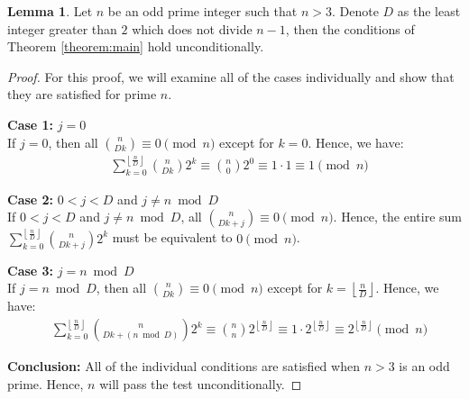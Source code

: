 \documentclass{article}
\theoremstyle{plain}
\theoremstyle{definition}
\newtheorem{lemma}{Lemma}
\newcommand{\floor}[1]{\left\lfloor #1 \right\rfloor}
\begin{document}
\begin{lemma} \label{lemma:primes}
Let $n$ be an odd prime integer such that $n > 3$. Denote $D$ as the least integer greater than $2$ which does not divide $n-1$, then the conditions of Theorem \ref{theorem:main} hold unconditionally.
\end{lemma}
\begin{proof}
For this proof, we will examine all of the cases individually and show that they are satisfied for prime $n$.

\textbf{Case 1:} $j=0$ \\
If $j = 0$, then all $\binom{n}{D k} \equiv 0 \pmod{n}$ except for $k=0$. Hence, we have:
\begin{align}
    & \sum_{k=0}^{\floor{\frac{n}{D}}} \binom{n}{D k} 2^{k} \equiv \binom{n}{0} 2^{0} \equiv 1 \cdot 1 \equiv 1 \pmod{n}
\end{align}

\textbf{Case 2:} $0 < j < D$ and $j \neq n \bmod{D}$ \\
If $0 < j < D$ and $j \neq n \bmod{D}$, all $\binom{n}{D k + j} \equiv 0 \pmod{n}$. Hence, the entire sum $\sum_{k=0}^{\floor{\frac{n}{D}}} \binom{n}{D k + j} 2^{k}$ must be equivalent to $0 \pmod{n}$.

\textbf{Case 3:} $j=n \bmod{D}$ \\
If $j = n \bmod{D}$, then all $\binom{n}{D k} \equiv 0 \pmod{n}$ except for $k=\floor{\frac{n}{D}}$. Hence, we have:
\begin{align}
    & \sum_{k=0}^{\floor{\frac{n}{D}}} \binom{n}{D k + (n \bmod{D})} 2^{k} \equiv \binom{n}{n} 2^{\floor{\frac{n}{D}}} \equiv 1 \cdot 2^{\floor{\frac{n}{D}}} \equiv 2^{\floor{\frac{n}{D}}} \pmod{n}
\end{align}

\textbf{Conclusion:}
All of the individual conditions are satisfied when $n > 3$ is an odd prime. Hence, $n$ will pass the test unconditionally.
\end{proof}
\end{document}
